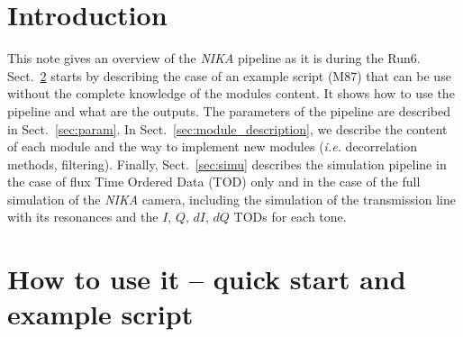 \documentclass[a4paper]{article}
\begin{document}
%
%
%
%




\section{Introduction}
This note gives an overview of the {\it NIKA} pipeline as it is during the Run6. Sect.~\ref{sec:example} starts by describing the case of an example script (M87) that can be use without the complete knowledge of the modules content. It shows how to use the pipeline and what are the outputs. The parameters of the pipeline are described in Sect.~\ref{sec:param}. In Sect.~\ref{sec:module_description}, we describe the content of each module and the way to implement new modules ({\it i.e.} decorrelation methods, filtering). Finally, Sect.~\ref{sec:simu} describes the simulation pipeline in the case of flux Time Ordered Data (TOD) only and in the case of the full simulation of the {\it NIKA} camera, including the simulation of the transmission line with its resonances and the $I$, $Q$, $dI$, $dQ$ TODs for each tone.

\section{How to use it -- quick start and example script}
\label{sec:example}
\end{document}
